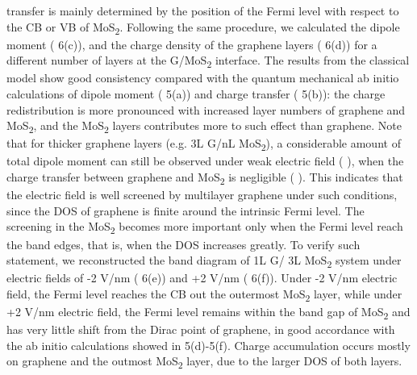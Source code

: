 transfer is mainly determined by the position of the Fermi level with
respect to the CB or VB of MoS\textsubscript{2}. Following the same procedure, we
calculated the dipole moment ( 6(c)), and the charge density of
the graphene layers ( 6(d)) for a different number of layers at
the G/MoS\textsubscript{2} interface. The results from the classical model show good
consistency compared with the quantum mechanical ab initio
calculations of dipole moment ( 5(a)) and charge transfer
( 5(b)): the charge redistribution is more pronounced with
increased layer numbers of graphene and MoS\textsubscript{2}, and the MoS\textsubscript{2} layers
contributes more to such effect than graphene. Note that for thicker
graphene layers (e.g. 3L G/nL MoS\textsubscript{2}), a considerable amount of total
dipole moment can still be observed under weak electric field ( ),
when the charge transfer between graphene and MoS\textsubscript{2} is negligible (
). This indicates that the electric field is well screened by
multilayer graphene under such conditions, since the DOS of graphene
is finite around the intrinsic Fermi level. The screening in the MoS\textsubscript{2}
becomes more important only when the Fermi level reach the band edges,
that is, when the DOS increases greatly. To verify such statement, we
reconstructed the band diagram of 1L G/ 3L MoS\textsubscript{2} system under electric
fields of -2 V/nm ( 6(e)) and +2 V/nm ( 6(f)). Under -2
V/nm electric field, the Fermi level reaches the CB out the outermost
MoS\textsubscript{2} layer, while under +2 V/nm electric field, the Fermi level
remains within the band gap of MoS\textsubscript{2} and has very little shift from the
Dirac point of graphene, in good accordance with the ab initio
calculations showed in  5(d)-5(f). Charge accumulation occurs
mostly on graphene and the outmost MoS\textsubscript{2} layer, due to the larger DOS
of both layers.

